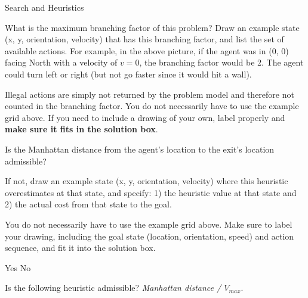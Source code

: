 \begin{problem} {Search and Heuristics}
\begin{question}[3]

\end{question}

\begin{question}[4] 
What is the maximum branching factor of this problem?
Draw an example state (x, y, orientation, velocity) that has this branching factor, and list the set of available actions. For example, in the above picture, if the agent was in (0, 0) facing North with a velocity of $v = 0$, the branching factor would be 2. The agent could turn left or right (but not go faster since it would hit a wall).

Illegal actions are simply not returned by the problem model and therefore not counted in the branching factor. You do not necessarily have to use the example grid above. If you need to include a drawing of your own, label properly and \textbf{make sure it fits in the solution box}.



\end{question}


 
\begin{question}[4]
Is the Manhattan distance from the agent’s location to the exit’s location admissible?

If not, draw an example state (x, y, orientation, velocity) where this heuristic overestimates at that state, and specify: 1) the heuristic value at that state and 2) the actual cost from that state to the goal.

You do not necessarily have to use the example grid above. Make sure to label your drawing, including the goal state (location, orientation, speed) and action sequence, and fit it into the solution box.

\hspace{5mm}
\solution{\emptycircle}{\OnedYes} Yes
\hspace{5mm}
\solution{\emptycircle}{\OnedNo} No


\end{question}

\begin{question}[4]
Is the following heuristic admissible? \textit{Manhattan distance / $V_{max}$}.


\end{question}
\end{problem}
